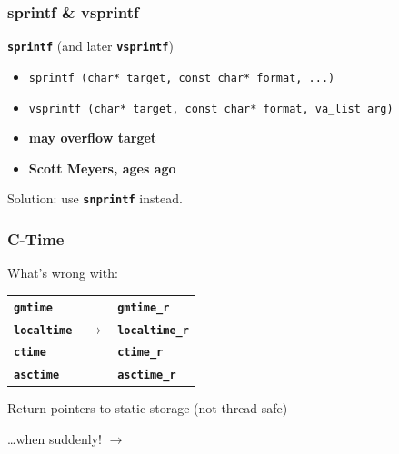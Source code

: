 \documentclass[aspectratio=169]{beamer}
\begin{document}
\begin{frame}
\frametitle{sprintf \& vsprintf}
{\huge \texttt{\textbf{sprintf}} (and later \texttt{\textbf{vsprintf}})}\par
\vspace{4ex}
\begin{itemize}
\item <1->\texttt{sprintf (char* target, const char* format, ...)}
\item <1->\texttt{vsprintf (char* target, const char* format, va\_list arg)}
\item <2->\textbf{\textcolor{clRedFlag}{may overflow target}}
\item <3->\textbf{\textcolor{clGreen}{Scott Meyers, ages ago}}
\end{itemize}

\vspace{2ex}
{\large Solution: \textcolor{clGreen}{use \texttt{\textbf{snprintf}} instead.}}
\end{frame}


\begin{frame}
\frametitle{C-Time}
{\Large What's wrong with:}\par

\begin{table}
\begin{tabular}{l >{\onslide<2->}c<{\onslide} >{\onslide<2->}l<{\onslide}}
  \texttt{\textbf{\textcolor{clRedFlag}{gmtime}}} & &
  \texttt{\textbf{\textcolor{clGreen}{gmtime\_r}}} \\

  \texttt{\textbf{\textcolor{clRedFlag}{localtime}}} & $\rightarrow{}$ &
  \texttt{\textbf{\textcolor{clGreen}{localtime\_r}}} \\

  \texttt{\textbf{\textcolor{clRedFlag}{ctime}}} & &
  \texttt{\textbf{\textcolor{clGreen}{ctime\_r}}} \\

  \texttt{\textbf{\textcolor{clRedFlag}{asctime}}} & &
  \texttt{\textbf{\textcolor{clGreen}{asctime\_r}}} \\
\end{tabular}
\end{table}
\pause{}
Return pointers to static storage (not thread-safe)
\pause{}
\vspace{1ex}
\begin{flushright}\ldots{}when suddenly! $\rightarrow{}$ \end{flushright}
\end{frame}
\end{document}
